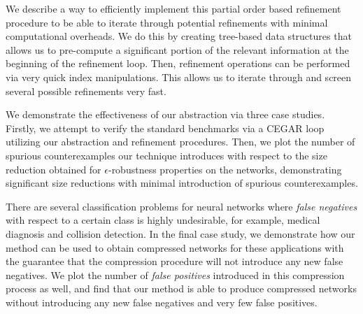 We describe a way to efficiently implement this partial order based refinement
procedure to be able to iterate through potential refinements with minimal
computational overheads. We do this by creating tree-based data structures that
allows us to pre-compute a significant portion of the relevant information at
the beginning of the refinement loop. Then, refinement operations can be
performed via very quick index manipulations. This allows us to iterate through
and screen several possible refinements very fast. 

We demonstrate the effectiveness of our abstraction via three case studies.
Firstly, we attempt to verify the standard \acasxu benchmarks via a CEGAR loop
utilizing our abstraction and refinement procedures.  Then, we plot the number of spurious counterexamples our technique
introduces with respect to the size reduction obtained for $\epsilon$-robustness
properties on the \mnist networks, demonstrating significant size reductions
with minimal introduction of spurious counterexamples. 

There are several classification problems for neural networks where
\textit{false negatives} with respect to a certain class is highly undesirable,
for example,
medical diagnosis and collision detection. In the final case study, we
demonstrate how our method can be used to obtain compressed networks for these
applications with the guarantee that the compression procedure will not
introduce any new false negatives. We plot the number of \textit{false
positives} introduced in this compression process as well, and find that our
method is able to produce compressed networks without introducing any new false
negatives and very few false positives. 
